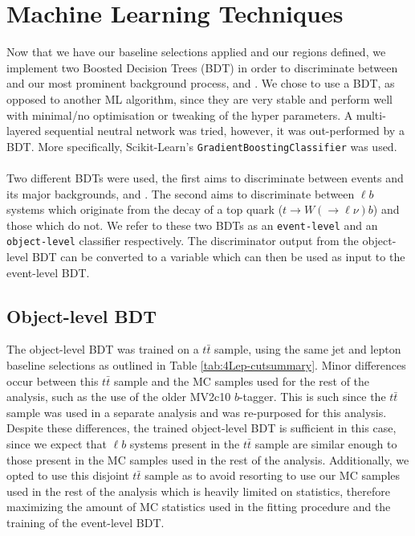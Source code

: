\section{Machine Learning Techniques}
Now that we have our baseline selections applied and our regions defined, we implement two Boosted Decision Trees (BDT) in order to discriminate between \tWZ and our most prominent background process, \ttZ and \ZZ. We chose to use a BDT, as opposed to another ML algorithm, since they are very stable and perform well with minimal/no optimisation or tweaking of the hyper parameters. A multi-layered sequential neutral network was tried, however, it was out-performed by a BDT. More specifically, Scikit-Learn's \texttt{GradientBoostingClassifier} was used.\\\\
Two different BDTs were used, the first aims to discriminate between \tWZ events and its major backgrounds, \ttZ and \ZZ. The second aims to discriminate between $\ell b$ systems which originate from the decay of a top quark ($t\rightarrow W(\rightarrow \ell \nu) b$) and those which do not. We refer to these two BDTs as an \texttt{event-level} and an \texttt{object-level} classifier respectively. The discriminator output from the object-level BDT can be converted to a variable which can then be used as input to the event-level BDT.
\subsection{Object-level BDT}
\label{sec:object-level-bdt}
The object-level BDT was trained on a $t\bar{t}$ sample, using the same jet and lepton baseline selections as outlined in Table \ref{tab:4Lep-cutsummary}. Minor differences occur between this $t\bar{t}$ sample and the MC samples used for the rest of the analysis, such as the use of the older MV2c10 $b$-tagger. This is such since the $t\bar{t}$ sample was used in a separate analysis and was re-purposed for this analysis. Despite these differences, the trained object-level BDT is sufficient in this case, since we expect that $\ell b$ systems present in the $t\bar{t}$ sample are similar enough to those present in the MC samples used in the rest of the analysis. Additionally, we opted to use this disjoint $t\bar{t}$ sample as to avoid resorting to use our MC samples used in the rest of the analysis which is heavily limited on statistics, therefore maximizing the amount of MC statistics used in the fitting procedure and the training of the event-level BDT.\\\\

